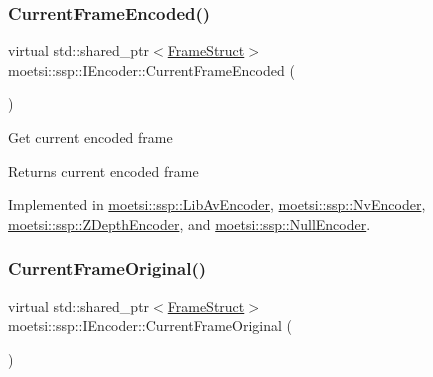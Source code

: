 \mbox{\label{classmoetsi_1_1ssp_1_1IEncoder_a178d117518e7c7007414ea9c82bd3ed6}} 
\subsubsection{\texorpdfstring{Current\+Frame\+Encoded()}{CurrentFrameEncoded()}}
{\footnotesize\ttfamily virtual std\+::shared\+\_\+ptr$<$\hyperlink{structmoetsi_1_1ssp_1_1FrameStruct}{Frame\+Struct}$>$ moetsi\+::ssp\+::\+I\+Encoder\+::\+Current\+Frame\+Encoded (\begin{DoxyParamCaption}{ }\end{DoxyParamCaption})\hspace{0.3cm}{\ttfamily [pure virtual]}}

Get current encoded frame \begin{DoxyReturn}{Returns}
current encoded frame 
\end{DoxyReturn}


Implemented in \hyperlink{classmoetsi_1_1ssp_1_1LibAvEncoder_aedb37703d73b55f1389a122d2ecbe923}{moetsi\+::ssp\+::\+Lib\+Av\+Encoder}, \hyperlink{classmoetsi_1_1ssp_1_1NvEncoder_adbc7d498e797af8c5bb31b5a2a82efdd}{moetsi\+::ssp\+::\+Nv\+Encoder}, \hyperlink{classmoetsi_1_1ssp_1_1ZDepthEncoder_a075752f62bbc40f71026812c5548ef5f}{moetsi\+::ssp\+::\+Z\+Depth\+Encoder}, and \hyperlink{classmoetsi_1_1ssp_1_1NullEncoder_ae48926f99c368849ee8822aed10ac1b5}{moetsi\+::ssp\+::\+Null\+Encoder}.

\mbox{\label{classmoetsi_1_1ssp_1_1IEncoder_ab60bdaae0a85289dfa31a12bab533dc0}} 
\subsubsection{\texorpdfstring{Current\+Frame\+Original()}{CurrentFrameOriginal()}}
{\footnotesize\ttfamily virtual std\+::shared\+\_\+ptr$<$\hyperlink{structmoetsi_1_1ssp_1_1FrameStruct}{Frame\+Struct}$>$ moetsi\+::ssp\+::\+I\+Encoder\+::\+Current\+Frame\+Original (\begin{DoxyParamCaption}{ }\end{DoxyParamCaption})\hspace{0.3cm}{\ttfamily [pure virtual]}}

